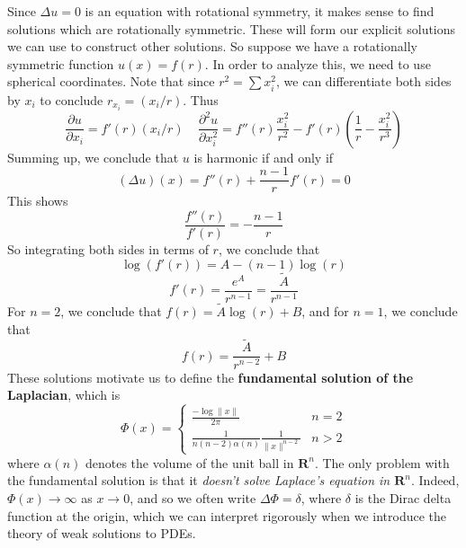 Since $\Delta u = 0$ is an equation with rotational symmetry, it makes sense to find solutions which are rotationally symmetric. These will form our explicit solutions we can use to construct other solutions. So suppose we have a rotationally symmetric function $u(x) = f(r)$. In order to analyze this, we need to use spherical coordinates. Note that since $r^2 = \sum x_i^2$, we can differentiate both sides by $x_i$ to conclude $r_{x_i} = (x_i/r)$. Thus
%
\[ \frac{\partial u}{\partial x_i} = f'(r) (x_i/r)\ \ \ \ \ \frac{\partial^2 u}{\partial x_i^2} = f''(r) \frac{x_i^2}{r^2} - f'(r) \left( \frac{1}{r} - \frac{x_i^2}{r^3} \right) \]
%
Summing up, we conclude that $u$ is harmonic if and only if
%
\[ (\Delta u)(x) = f''(r) + \frac{n-1}{r} f'(r) = 0 \]
%
This shows
%
\[ \frac{f''(r)}{f'(r)} = -\frac{n-1}{r} \]
%
So integrating both sides in terms of $r$, we conclude that
%
\[ \log(f'(r)) = A - (n-1) \log(r) \]
\[ f'(r) = \frac{e^A}{r^{n-1}} = \frac{\tilde{A}}{r^{n-1}} \]
%
For $n = 2$, we conclude that $f(r) = \tilde{A} \log(r) + B$, and for $n = 1$, we conclude that
%
\[ f(r) = \frac{\tilde{A}}{r^{n-2}} + B \]
%
These solutions motivate us to define the {\bf fundamental solution of the Laplacian}, which is
%
\[ \Phi(x) = \begin{cases} \frac{-\log \| x \|}{2\pi} & n = 2\\ \frac{1}{n(n-2)\alpha(n)}\frac{1}{\|x\|^{n-2}} & n > 2 \end{cases} \]
%
where $\alpha(n)$ denotes the volume of the unit ball in $\mathbf{R}^n$. The only problem with the fundamental solution is that it {\it doesn't solve Laplace's equation in $\mathbf{R}^n$}. Indeed, $\Phi(x) \to \infty$ as $x \to 0$, and so we often write $\Delta \Phi = \delta$, where $\delta$ is the Dirac delta function at the origin, which we can interpret rigorously when we introduce the theory of weak solutions to PDEs.


